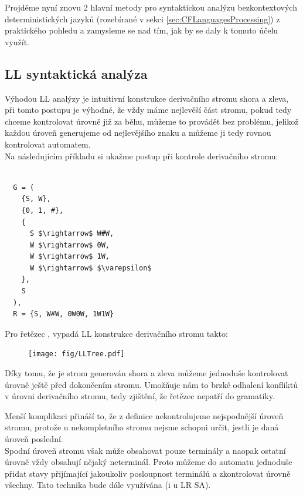 Projděme nyní znovu 2 hlavní metody pro syntaktickou analýzu bezkontextových
deterministických jazyků (rozebírané v sekci \ref{sec:CFLanguagesProcessing})
z praktického pohledu a zamysleme se nad tím, jak by se daly k tomuto účelu
využít.

\subsection{LL syntaktická analýza}

Výhodou LL analýzy je intuitivní konstrukce derivačního stromu shora a zleva,
při tomto postupu je výhodné, že vždy máme nejlevěší část stromu, pokud tedy
chceme kontrolovat úrovně již za běhu, můžeme to provádět bez problému, jelikož
každou úroveň generujeme od nejlevějšího znaku a můžeme ji tedy rovnou
kontrolovat automatem.\\

\noindent
Na následujícím příkladu si ukažme postup při kontrole derivačního stromu:
\begin{exmp}
  \label{exmp:WW}
  \begin{lstlisting}

  G = (
    {S, W},
    {0, 1, #},
    {
      S $\rightarrow$ W#W,
      W $\rightarrow$ 0W,
      W $\rightarrow$ 1W,
      W $\rightarrow$ $\varepsilon$
    },
    S
  ),
  R = {S, W#W, 0W0W, 1W1W}
  \end{lstlisting}

  \noindent
  Pro řetězec , vypadá LL konstrukce derivačního stromu takto:

  \begin{figure}[H]
    \centering
    \texttt{[image: fig/LLTree.pdf]}
  \end{figure}

  Díky tomu, že je strom generován shora a zleva můžeme jednoduše
  kontrolovat úrovně ještě před dokončením stromu. Umožňuje nám to brzké
  odhalení konfliktů v úrovni derivačního stromu, tedy zjištění, že řetězec
  nepatří do gramatiky.\\

\end{exmp}

Menší komplikaci přináší to, že z definice nekontrolujeme
nejspodnější úroveň stromu, protože u nekompletního stromu nejsme schopni určit,
jestli je daná úroveň poslední.\\
Spodní úroveň stromu však může obsahovat pouze terminály a naopak
ostatní úrovně vždy obsahují nějaký neterminál. Proto můžeme do automatu
jednoduše přidat stavy přijímající jakoukoliv posloupnost terminálů a
zkontrolovat úrovně všechny. Tato technika bude dále využívána (i u LR SA).\\

